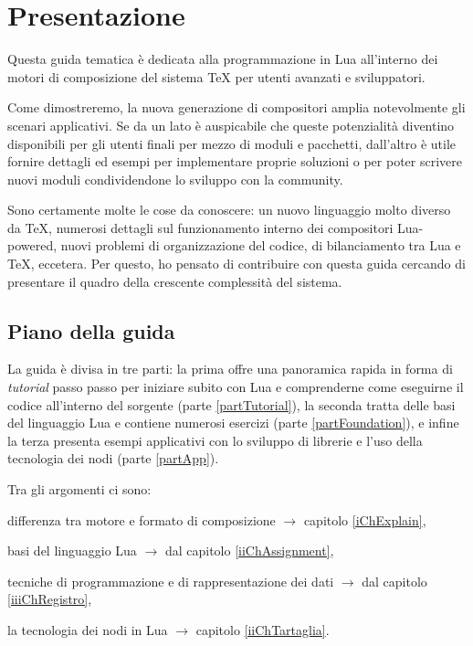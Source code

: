 

\chapter{Presentazione}

Questa guida tematica è dedicata alla programmazione in Lua all'interno dei
motori di composizione del sistema \TeX{} per utenti avanzati e sviluppatori.

Come dimostreremo, la nuova generazione di compositori amplia notevolmente gli
scenari applicativi. Se da un lato è auspicabile che queste potenzialità
diventino disponibili per gli utenti finali per mezzo di moduli e pacchetti,
dall'altro è utile fornire dettagli ed esempi per implementare proprie soluzioni
o per poter scrivere nuovi moduli condividendone lo sviluppo con la community.

Sono certamente molte le cose da conoscere: un nuovo linguaggio molto diverso da
\TeX{}, numerosi dettagli sul funzionamento interno dei compositori Lua-powered,
nuovi problemi di organizzazione del codice, di bilanciamento tra Lua e \TeX,
eccetera. Per questo, ho pensato di contribuire con questa guida cercando di
presentare il quadro della crescente complessità del sistema.


\section{Piano della guida}

La guida è divisa in tre parti: la prima offre una panoramica rapida in forma di
\emph{tutorial} passo passo per iniziare subito con Lua e comprenderne come
eseguirne il codice all'interno del sorgente (parte \ref{partTutorial}), la
seconda tratta delle basi del linguaggio Lua e contiene numerosi esercizi (parte
\ref{partFoundation}), e infine la terza presenta esempi applicativi con lo
sviluppo di librerie e l'uso della tecnologia dei nodi (parte \ref{partApp}).

Tra gli argomenti ci sono:
\begin{compactitemize}
\item differenza tra motore e formato di composizione \( \to \) capitolo
\ref{iChExplain},
\item basi del linguaggio Lua \( \to \) dal capitolo \ref{iiChAssignment},
\item tecniche di programmazione e di rappresentazione dei dati \( \to \) dal
capitolo \ref{iiiChRegistro},
\item la tecnologia dei nodi in Lua \( \to \) capitolo \ref{iiChTartaglia}.
\end{compactitemize}


